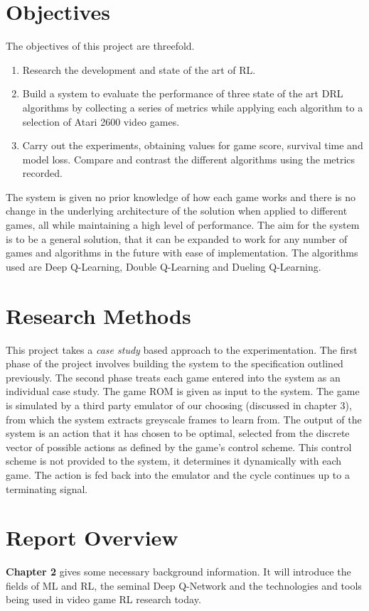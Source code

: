 \section{Objectives}
The objectives of this project are threefold. 
\begin{enumerate}
	\item Research the development and state of the art of RL.
	\item Build a system to evaluate the performance of three state of the art DRL algorithms by collecting a series of metrics while applying each algorithm to a selection of Atari 2600 video games. 
	\item Carry out the experiments, obtaining values for game score, survival time and model loss. Compare and contrast the different algorithms using the metrics recorded.
\end{enumerate}
The system is given no prior knowledge of how each game works and there is no change in the underlying architecture of the solution when applied to different games, all while maintaining a high level of performance. The aim for the system is to be a general solution, that it can be expanded to work for any number of games and algorithms in the future with ease of implementation. The algorithms used are Deep Q-Learning, Double Q-Learning and Dueling Q-Learning.
\section{Research Methods}
This project takes a \textit{case study} based approach to the experimentation. The first phase of the project involves building the system to the specification outlined previously. The second phase treats each game entered into the system as an individual case study. The game ROM is given as input to the system. The game is simulated by a third party emulator of our choosing (discussed in chapter 3), from which the system extracts greyscale frames to learn from. The output of the system is an action that it has chosen to be optimal, selected from the discrete vector of possible actions as defined by the game's control scheme. This control scheme is not provided to the system, it determines it dynamically with each game. The action is fed back into the emulator and the cycle continues up to a terminating signal.

\section{Report Overview}
\textbf{Chapter 2} gives some necessary background information. It will introduce the fields of ML and RL, the seminal Deep Q-Network and the technologies and tools being used in video game RL research today.

